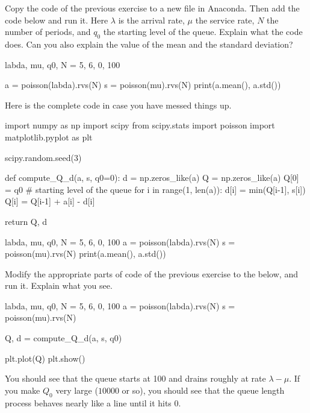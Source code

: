 \begin{exercise}\label{ex:4}
Copy the code of the previous exercise to a new file in Anaconda. Then add the code below and run it. Here $\lambda$ is the arrival rate, $\mu$ the service rate, $N$ the number of periods, and $q_0$ the starting level of the queue. Explain what the code does. Can you also explain the value of the mean and the standard deviation? 

  \begin{pyverbatim}

labda, mu, q0, N = 5, 6, 0, 100

a = poisson(labda).rvs(N)
s = poisson(mu).rvs(N)
print(a.mean(), a.std())
\end{pyverbatim}
\begin{solution}
  Here is the complete code in case you have messed things up.

\begin{pyverbatim}
import numpy as np
import scipy
from scipy.stats import poisson
import matplotlib.pyplot as plt

scipy.random.seed(3) 


def compute_Q_d(a, s, q0=0):
    d = np.zeros_like(a)
    Q = np.zeros_like(a)
    Q[0] = q0 # starting level of the queue
    for i in range(1, len(a)):
        d[i] = min(Q[i-1], s[i])
        Q[i] = Q[i-1] + a[i] - d[i]

    return Q, d


labda, mu, q0, N = 5, 6, 0, 100
a = poisson(labda).rvs(N)
s = poisson(mu).rvs(N)
print(a.mean(), a.std())
\end{pyverbatim}

\end{solution}
\end{exercise}

\begin{exercise}
  Modify  the appropriate parts of  code of the previous exercise to the below,  and run it. Explain what you see.

  \begin{pyverbatim}
labda, mu, q0, N = 5, 6, 0, 100
a = poisson(labda).rvs(N)
s = poisson(mu).rvs(N)

Q, d = compute_Q_d(a, s, q0)

plt.plot(Q)
plt.show()
\end{pyverbatim}

\begin{solution}
  You should see that the queue starts at 100 and drains roughly at rate $\lambda-\mu$. If you make $Q_0$ very large ($10 000$ or so), you should see that the queue length process behaves nearly like a line until it hits 0.
\end{solution}
\end{exercise}


